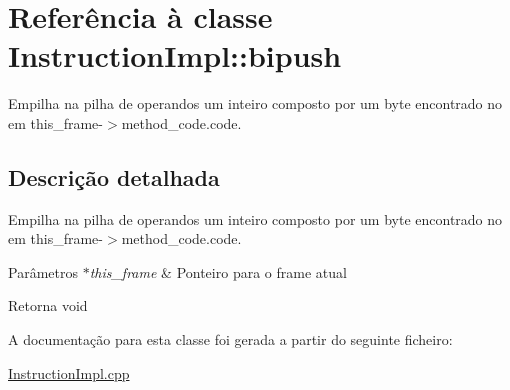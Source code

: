 \hypertarget{class_instruction_impl_1_1bipush}{}\section{Referência à classe Instruction\+Impl\+:\+:bipush}
\label{class_instruction_impl_1_1bipush}


Empilha na pilha de operandos um inteiro composto por um byte encontrado no em this\+\_\+frame-\/$>$method\+\_\+code.\+code.  




\subsection{Descrição detalhada}
Empilha na pilha de operandos um inteiro composto por um byte encontrado no em this\+\_\+frame-\/$>$method\+\_\+code.\+code. 


\begin{DoxyParams}{Parâmetros}
{\em $\ast$this\+\_\+frame} & Ponteiro para o frame atual \\
\hline
\end{DoxyParams}
\begin{DoxyReturn}{Retorna}
void 
\end{DoxyReturn}


A documentação para esta classe foi gerada a partir do seguinte ficheiro\+:\begin{DoxyCompactItemize}
\item 
\hyperlink{_instruction_impl_8cpp}{Instruction\+Impl.\+cpp}\end{DoxyCompactItemize}
